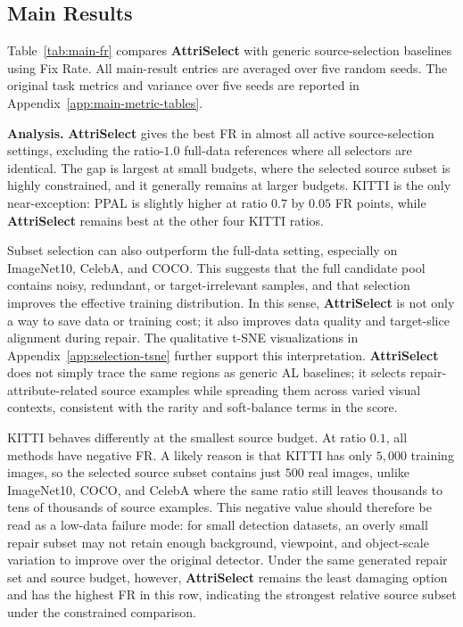 \documentclass{article}
\newcommand{\modelname}{AttriSelect}
\newcommand{\model}{\textcolor{darkteal}{\textbf{\modelname}}\xspace}
\begin{document}
\subsection{Main Results}

Table~\ref{tab:main-fr} compares \model with generic source-selection baselines using Fix Rate. All main-result entries are averaged over five random seeds. The original task metrics and variance over five seeds are reported in Appendix~\ref{app:main-metric-tables}.

\noindent\textbf{Analysis.} \model gives the best FR in almost all active source-selection settings, excluding the ratio-$1.0$ full-data references where all selectors are identical. The gap is largest at small budgets, where the selected source subset is highly constrained, and it generally remains at larger budgets. KITTI is the only near-exception: PPAL is slightly higher at ratio $0.7$ by $0.05$ FR points, while \model remains best at the other four KITTI ratios.

Subset selection can also outperform the full-data setting, especially on ImageNet10, CelebA, and COCO. This suggests that the full candidate pool contains noisy, redundant, or target-irrelevant samples, and that selection improves the effective training distribution. In this sense, \model is not only a way to save data or training cost; it also improves data quality and target-slice alignment during repair. The qualitative t-SNE visualizations in Appendix~\ref{app:selection-tsne} further support this interpretation. \model does not simply trace the same regions as generic AL baselines; it selects repair-attribute-related source examples while spreading them across varied visual contexts, consistent with the rarity and soft-balance terms in the score.

KITTI behaves differently at the smallest source budget. At ratio $0.1$, all methods have negative FR. A likely reason is that KITTI has only $5{,}000$ training images, so the selected source subset contains just $500$ real images, unlike ImageNet10, COCO, and CelebA where the same ratio still leaves thousands to tens of thousands of source examples. This negative value should therefore be read as a low-data failure mode: for small detection datasets, an overly small repair subset may not retain enough background, viewpoint, and object-scale variation to improve over the original detector. Under the same generated repair set and source budget, however, \model remains the least damaging option and has the highest FR in this row, indicating the strongest relative source subset under the constrained comparison.
\end{document}
